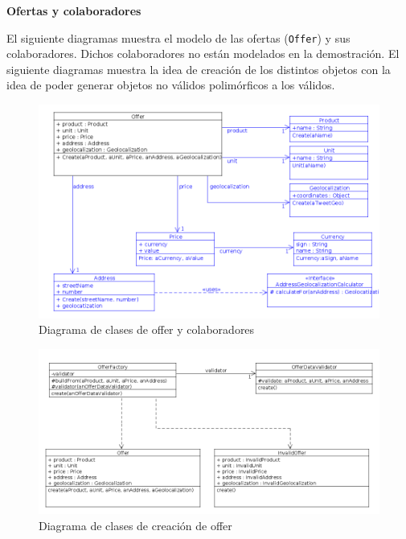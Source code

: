 \textbf{Ofertas y colaboradores}

El siguiente diagramas muestra el modelo de las ofertas (\texttt{Offer}) y sus colaboradores. Dichos colaboradores no est\'an modelados en la demostraci\'on.
El siguiente diagramas muestra la idea de creaci\'on de los distintos objetos
con la idea de poder generar objetos no v\'alidos polim\'orficos a los v\'alidos.

\begin{figure}[h]
\centerline{\includegraphics[width=\textwidth]{./imgs/class_diagram_offer.png}}
\caption{Diagrama de clases de offer y colaboradores}
\label{fig:class_offer}
\end{figure}

\begin{figure}[h]
\centerline{\includegraphics[width=\textwidth]{./imgs/class_diagram_Offer_Factory.png}}
\caption{Diagrama de clases de creaci\'on de offer}
\label{fig:class_Offer_Factory}
\end{figure}

